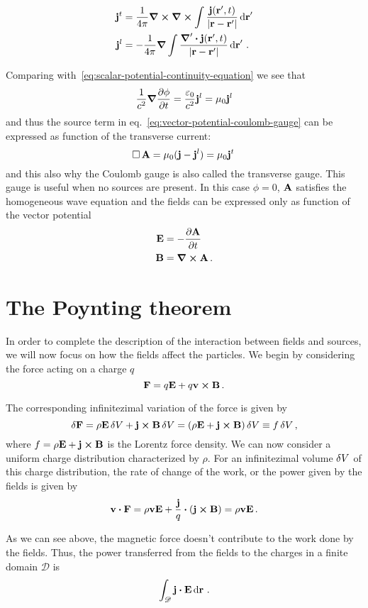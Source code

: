 \documentclass[12pt, class=report, crop=false]{standalone}
\begin{document}
\begin{align*}
  \vb{j}^t &= \frac{1}{4\pi} \curl \curl \int \frac{\vb{j}(\vb{r}',t)}{|\vb{r}-\vb{r}'|} \dd{\vb{r}}' \\
  \vb{j}^l &= -\frac{1}{4\pi} \grad \int
    \frac{\boldsymbol{\nabla}' \vdot \vb{j}(\vb{r}',t)}{|\vb{r}-\vb{r}'|} \dd{\vb{r}}'\,.
\end{align*}

Comparing with~\eqref{eq:scalar-potential-continuity-equation} we see that
\[
  \frac{1}{c^2} \grad{\pdv{\phi}{t}} = \frac{\varepsilon_0}{c^2} \vb{j}^l
  = \mu_0 \vb{j}^l
\]
and thus the source term in eq.~\eqref{eq:vector-potential-coulomb-gauge} can
be expressed as function of the transverse current:
\[
  \operatorname{\Box} \vb{A} = \mu_0 (\vb{j} - \vb{j}^l) = \mu_0 \vb{j}^t\,
\]
and this also why the Coulomb gauge is also called the transverse gauge.
This gauge is useful when no sources are present. In this case \(\phi=0\),
\(\vb{A}\) satisfies the homogeneous wave equation and the fields can
be expressed only as function of the vector potential
\begin{align*}
  \vb{E} &= -\pdv{\vb{A}}{t} \\
  \vb{B} &= \curl{\vb{A}}\,.
\end{align*}

\section{The Poynting theorem}

In order to complete the description of the interaction between fields
and sources, we will now focus on how the fields affect the particles.
We begin by considering the force acting on a charge \(q\)
\[
  \vb{F} = q\vb{E} + q\vb{v} \cp \vb{B}\,.
\]

The corresponding infinitezimal variation of the force is given by
\[
  \var{\vb{F}} = \rho \vb{E} \var{V} + \vb{j} \cp \vb{B} \var{V}
    = (\rho \vb{E} + \vb{j} \cp \vb{B}) \var{V}
    \equiv f \var{V},
\]
where \(f = \rho \vb{E} + \vb{j} \cp \vb{B}\) is the Lorentz force
density. We can now consider a uniform charge distribution characterized
by \(\rho\). For an infinitezimal volume \(\var{V}\) of this charge distribution,
the rate of change of the work, or the power given by the
fields is given by
\[
  \vb{v} \vdot \vb{F} = \rho \vb{v} \vb{E} + \frac{\vb{j}}{q} \vdot (\vb{j} \cp \vb{B})
    = \rho \vb{v} \vb{E}\,.
\]

As we can see above, the magnetic force doesn't contribute to the work
done by the fields. Thus, the power transferred from the fields to the
charges in a finite domain \(\mathscr{D}\) is
\[
  \int_{\mathscr{D}} \vb{j} \vdot \vb{E} \dd{\vb{r}}\,.
\]
\end{document}
